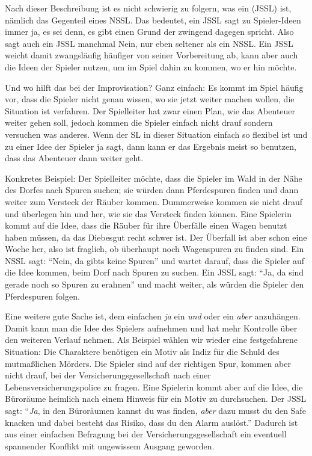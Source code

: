 Nach dieser Beschreibung ist es nicht schwierig zu folgern, was ein
 (JSSL) ist,
nämlich das Gegenteil eines NSSL. Das bedeutet, ein
JSSL sagt zu Spieler-Ideen immer ja, es sei denn, es gibt einen Grund der
zwingend dagegen spricht. Also sagt auch ein JSSL manchmal Nein, nur eben
seltener als ein NSSL. Ein JSSL weicht damit zwangsläufig häufiger von seiner
Vorbereitung ab, kann aber auch die Ideen der Spieler nutzen, um im Spiel dahin
zu kommen, wo er hin möchte.

Und wo hilft das bei der Improvisation? Ganz einfach: Es kommt im Spiel häufig
vor, dass die Spieler nicht genau wissen, wo sie jetzt weiter machen wollen,
die Situation ist verfahren. Der Spielleiter hat zwar einen Plan, wie das
Abenteuer weiter gehen soll, jedoch kommen die Spieler einfach nicht drauf
sondern versuchen was anderes. Wenn der SL in dieser Situation einfach so
flexibel ist und zu einer Idee der Spieler ja sagt, dann kann er das Ergebnis
meist so benutzen, dass das Abenteuer dann weiter geht.

Konkretes Beispiel: Der Spielleiter möchte, dass die Spieler im Wald in der
Nähe des Dorfes nach Spuren suchen; sie würden dann Pferdespuren finden und
dann weiter zum Versteck der Räuber kommen. Dummerweise kommen sie nicht drauf
und überlegen hin und her, wie sie das Versteck finden können. Eine Spielerin
kommt auf die Idee, dass die Räuber für ihre Überfälle einen Wagen benutzt
haben müssen, da das Diebesgut recht schwer ist. Der Überfall ist aber schon
eine Woche her, also ist fraglich, ob überhaupt noch Wagenspuren zu finden
sind. Ein NSSL sagt: ``Nein, da gibts keine Spuren'' und wartet darauf, dass die
Spieler auf die Idee kommen, beim Dorf nach Spuren zu suchen. Ein JSSL sagt:
``Ja, da sind gerade noch so Spuren zu erahnen'' und macht weiter, als würden die
Spieler den Pferdespuren folgen.

Eine weitere gute Sache ist, dem einfachen \emph{ja} ein \emph{und} oder ein \emph{aber} 
anzuhängen. Damit kann man die Idee des Spielers aufnehmen und hat mehr Kontrolle über den
weiteren Verlauf nehmen. Als Beispiel wählen wir wieder eine festgefahrene
Situation: Die Charaktere benötigen ein Motiv als Indiz für die Schuld des
mutmaßlichen Mörders. Die Spieler sind auf der richtigen Spur, kommen aber
nicht drauf, bei der Versicherungsgesellschaft nach einer
Lebensversicherungspolice zu fragen. Eine Spielerin kommt aber auf die Idee,
die Büroräume heimlich nach einem Hinweis für ein Motiv zu durchsuchen. Der
JSSL sagt: ``\emph{Ja}, in den Büroräumen kannst du was finden, \emph{aber} dazu musst du
den Safe knacken und dabei besteht das Risiko, dass du den Alarm auslöst.''
Dadurch ist aus einer einfachen Befragung bei der Versicherungsgesellschaft ein
eventuell spannender Konflikt mit ungewissem Ausgang geworden.

